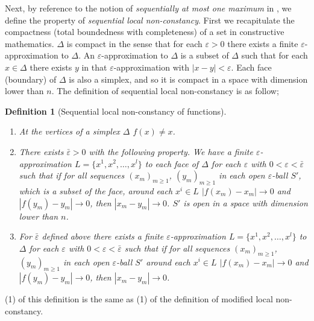 \documentclass[reqno]{amsart}
\newtheorem{defn}{Definition}
\begin{document}
Next, by reference to the notion of \emph{sequentially at most one maximum} in \cite{berg}, we define the property of \emph{sequential local non-constancy}. First we recapitulate the compactness (total boundedness with completeness) of a set in constructive mathematics. $\Delta$ is compact in the sense that for each $\varepsilon>0$ there exists a finite $\varepsilon$-approximation to $\Delta$. An $\varepsilon$-approximation to $\Delta$ is a subset of $\Delta$ such that for each $x\in \Delta$ there exists $y$ in that $\varepsilon$-approximation with $|x-y|<\varepsilon$. Each face (boundary) of $\Delta$ is also a simplex, and so it is compact in a space with dimension lower than $n$. The definition of sequential local non-constancy is as follow;
\begin{defn}[Sequential local non-constancy of functions]
\begin{enumerate}
\item At the vertices of a simplex $\Delta$ $f(x)\neq x$.
\item There exists $\bar{\varepsilon}>0$ with the following property. We have a finite $\varepsilon$-approximation $L=\{x^1, x^2, \dots, x^l\}$ to each face of $\Delta$ for each $\varepsilon$ with $0<\varepsilon<\bar{\varepsilon}$ such that if for all sequences $(x_m)_{m\geq 1}$, $(y_m)_{m\geq 1}$ in each open $\varepsilon$-ball $S'$, which is a subset of the face, around each $x^i\in L$ $|f(x_m)-x_m|\longrightarrow 0$ and $|f(y_m)-y_m|\longrightarrow 0$, then $|x_m-y_m|\longrightarrow 0$. $S'$ is open in a space with dimension lower than $n$.
\item For $\bar{\varepsilon}$ defined above there exists a finite $\varepsilon$-approximation $L=\{x^1, x^2, \dots, x^l\}$ to $\Delta$ for each $\varepsilon$ with $0<\varepsilon<\bar{\varepsilon}$ such that if for all sequences $(x_m)_{m\geq 1}$, $(y_m)_{m\geq 1}$ in each open $\varepsilon$-ball $S'$ around each $x^i\in L$ $|f(x_m)-x_m|\longrightarrow 0$ and $|f(y_m)-y_m|\longrightarrow 0$, then $|x_m-y_m|\longrightarrow 0$.
\end{enumerate}\label{sln}
\end{defn}
(1) of this definition is the same as (1) of the definition of modified local non-constancy. 
\end{document}
